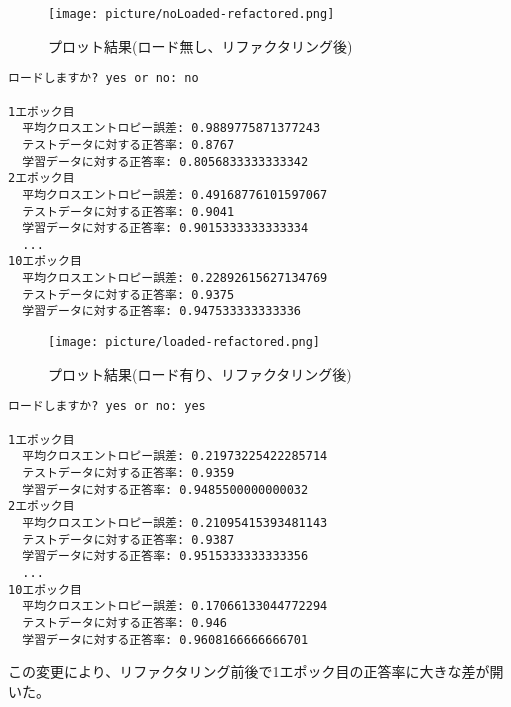 \documentclass[11px,a4,dvipdfmx]{jsarticle}
\begin{document}
 \begin{figure}[H]
		      \begin{center}
			      \texttt{[image: picture/noLoaded-refactored.png]}
			      \caption{プロット結果(ロード無し、リファクタリング後)}
		      \end{center}
\end{figure}
\begin{verbatim}
ロードしますか? yes or no: no

1エポック目
  平均クロスエントロピー誤差: 0.9889775871377243
  テストデータに対する正答率: 0.8767
  学習データに対する正答率: 0.8056833333333342
2エポック目
  平均クロスエントロピー誤差: 0.49168776101597067
  テストデータに対する正答率: 0.9041
  学習データに対する正答率: 0.9015333333333334
  ...
10エポック目
  平均クロスエントロピー誤差: 0.22892615627134769
  テストデータに対する正答率: 0.9375
  学習データに対する正答率: 0.947533333333336
\end{verbatim}
 \begin{figure}[H]
		      \begin{center}
			      \texttt{[image: picture/loaded-refactored.png]}
			      \caption{プロット結果(ロード有り、リファクタリング後)}
		      \end{center}
\end{figure}
\begin{verbatim}
ロードしますか? yes or no: yes

1エポック目
  平均クロスエントロピー誤差: 0.21973225422285714
  テストデータに対する正答率: 0.9359
  学習データに対する正答率: 0.9485500000000032
2エポック目
  平均クロスエントロピー誤差: 0.21095415393481143
  テストデータに対する正答率: 0.9387
  学習データに対する正答率: 0.9515333333333356
  ...
10エポック目
  平均クロスエントロピー誤差: 0.17066133044772294
  テストデータに対する正答率: 0.946
  学習データに対する正答率: 0.9608166666666701
\end{verbatim}
この変更により、リファクタリング前後で1エポック目の正答率に大きな差が開いた。
\end{document}
